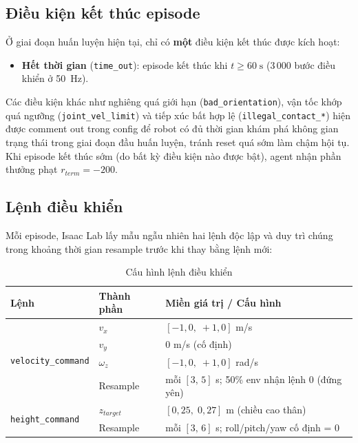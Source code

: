 \subsection{Điều kiện kết thúc episode}
\label{sec:terminations}

Ở giai đoạn huấn luyện hiện tại, chỉ có \textbf{một} điều kiện kết thúc
được kích hoạt:
\begin{itemize}
    \item \textbf{Hết thời gian} (\texttt{time\_out}): episode kết thúc khi
    $t \geq 60\;\text{s}$ (3\,000 bước điều khiển ở 50~Hz).
\end{itemize}
Các điều kiện khác như nghiêng quá giới hạn (\texttt{bad\_orientation}),
vận tốc khớp quá ngưỡng (\texttt{joint\_vel\_limit}) và tiếp xúc bất hợp
lệ (\texttt{illegal\_contact\_*}) hiện được comment out trong config để robot
có đủ thời gian khám phá không gian trạng thái trong giai đoạn đầu huấn
luyện, tránh reset quá sớm làm chậm hội tụ.
Khi episode kết thúc sớm (do bất kỳ điều kiện nào được bật), agent nhận
phần thưởng phạt $r_{term} = -200$.

\subsection{Lệnh điều khiển}

Mỗi episode, Isaac Lab lấy mẫu ngẫu nhiên hai lệnh độc lập và duy trì
chúng trong khoảng thời gian resample trước khi thay bằng lệnh mới:

\begin{table}[H]
    \centering
    \caption{Cấu hình lệnh điều khiển}
    \label{tab:commands_cfg}
    \renewcommand{\arraystretch}{1.3}
    \begin{tabular}{|l|l|l|}
    \hline
    \textbf{Lệnh} & \textbf{Thành phần} & \textbf{Miền giá trị / Cấu hình} \\
    \hline
    \multirow{4}{*}{\texttt{velocity\_command}}
        & $v_x$    & $[-1{,}0,\;+1{,}0]$ m/s \\
        & $v_y$    & $0$ m/s (cố định) \\
        & $\omega_z$ & $[-1{,}0,\;+1{,}0]$ rad/s \\
        & Resample & mỗi $[3,\,5]$ s; 50\% env nhận lệnh 0 (đứng yên) \\
    \hline
    \multirow{2}{*}{\texttt{height\_command}}
        & $z_{target}$ & $[0{,}25,\;0{,}27]$ m (chiều cao thân) \\
        & Resample & mỗi $[3,\,6]$ s; roll/pitch/yaw cố định = 0 \\
    \hline
    \end{tabular}
\end{table}

